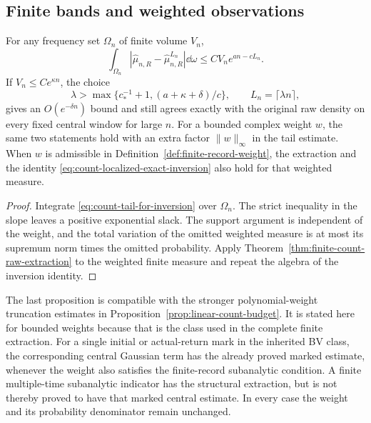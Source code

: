 \subsection{Finite bands and weighted observations}
\begin{proposition}
\label{prop:cutoff-finite-band-budget}
For any frequency set $\Omega_n$ of finite volume $V_n$,
\[
 \int_{\Omega_n}|\widehat\mu_{n,R}-\widehat\mu^{L_n}_{n,R}|\dd\omega
       \le C V_n e^{an-cL_n}.
\]
If $V_n\le C e^{\kappa n}$, the choice
\[
 \lambda>\max\{c_*^{-1}+1,(a+\kappa+\delta)/c\},
 \qquad L_n=\lceil\lambda n\rceil,
\]
gives an $O(e^{-\delta n})$ bound and still agrees exactly with the
original raw density on every fixed central window for large $n$.
For a bounded complex weight $w$, the same two statements hold with
an extra factor $\|w\|_\infty$ in the tail estimate. When $w$ is
admissible in Definition~\ref{def:finite-record-weight}, the extraction
and the identity \eqref{eq:count-localized-exact-inversion} also hold
for that weighted measure.
\end{proposition}
\begin{proof}
Integrate \eqref{eq:count-tail-for-inversion} over $\Omega_n$.
The strict inequality in the slope leaves a positive exponential slack.
The support argument is independent of the weight, and the total
variation of the omitted weighted measure is at most its supremum
norm times the omitted probability. Apply
Theorem~\ref{thm:finite-count-raw-extraction} to the weighted finite
measure and repeat the algebra of the inversion identity.
\end{proof}

The last proposition is compatible with the stronger polynomial-weight
truncation estimates in Proposition~\ref{prop:linear-count-budget}.
It is stated here for bounded weights because that is the class used in
the complete finite extraction. For a single initial or actual-return
mark in the inherited BV class, the corresponding central Gaussian
term has the already proved marked estimate, whenever the weight also
satisfies the finite-record subanalytic condition. A finite multiple-time
subanalytic indicator has the structural extraction, but is not thereby
proved to have that marked central estimate. In every case the weight
and its probability denominator remain unchanged.

